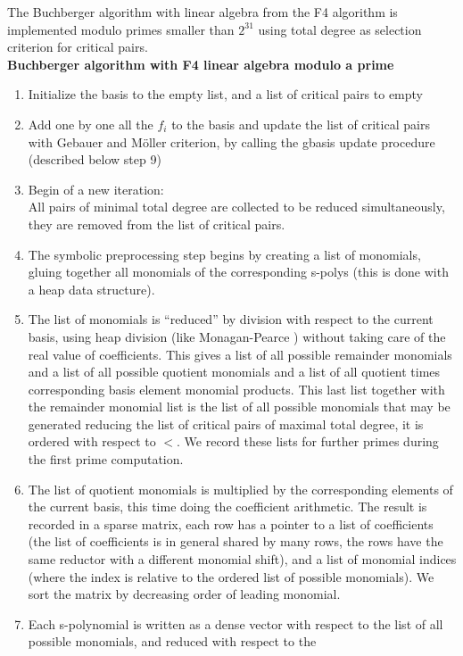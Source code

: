 \documentclass[a4paper,11pt]{article}
\begin{document}
\begin{giacjshere}
The Buchberger algorithm with linear algebra 
from the F4 algorithm is implemented modulo primes smaller than $2^{31}$
using total degree as selection criterion for critical pairs.\\
{\bf Buchberger algorithm with F4 linear algebra modulo a prime}
\begin{enumerate}
\item Initialize the basis to the empty list, and a list of critical
  pairs to empty
\item Add one by one all the $f_i$ to the basis and update
the list of critical pairs with Gebauer and M\"oller criterion, 
by calling the gbasis update procedure (described below step 9)
\item Begin of a new iteration:\\
All pairs of minimal total degree are
collected to be reduced simultaneously, they are removed from
the list of critical pairs.
\item The symbolic preprocessing step begins by creating 
a list of monomials, gluing
together all monomials of the corresponding s-polys (this
is done with a heap data structure). 
\item The list of monomials is ``reduced'' by division with respect 
to the current basis,
using heap division (like Monagan-Pearce \cite{monagan2011sparse}) 
without taking care
of the real value of coefficients. This gives a list of all possible remainder
monomials and a list of all possible quotient monomials and a list
of all quotient times corresponding basis element monomial products.
This last list together with the remainder monomial list is the
list of all possible monomials that may be generated reducing
the list of critical pairs of maximal total degree, 
it is ordered with respect to $<$. We
record these lists for further primes during the first prime computation.
\item The list
of quotient monomials is multiplied by the corresponding elements of the current
basis, this time doing the coefficient arithmetic.
The result is recorded in a sparse matrix, each row has a pointer
to a list of coefficients (the list of coefficients 
is in general shared by many rows, the rows have the
same reductor with a different monomial shift), 
and a list of monomial indices (where the index 
is relative to the ordered list of possible monomials). We sort
the matrix by decreasing order of leading monomial.
\item
Each s-polynomial is written as a dense vector with respect to the
list of all possible monomials, and reduced with respect to the

\end{enumerate}
\end{giacjshere}
\end{document}
